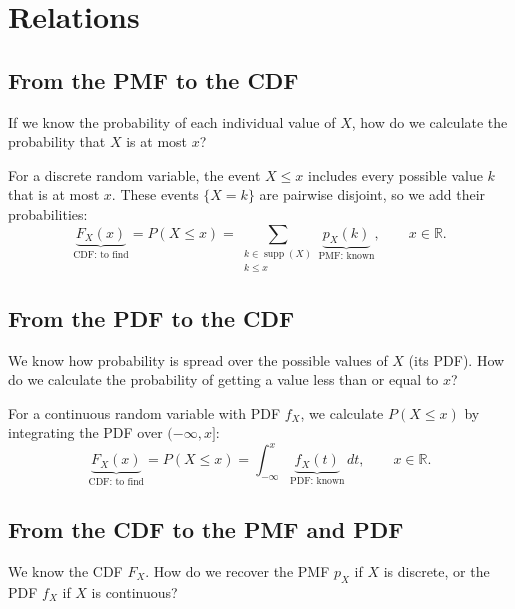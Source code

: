 \documentclass[a4paper,12pt,oneside]{report}
\begin{document}
\clearpage

\section{Relations}
\subsection{From the PMF to the CDF}
\begin{tcolorbox}[colback=blue!3,colframe=blue!30!black,
  boxrule=0.4pt,arc=1mm,title={What we are trying to answer},
  colbacktitle=blue!10,coltitle=black,fonttitle=\bfseries]
If we know the probability of each individual
value of $X$, how do we calculate the probability that $X$ is at most $x$?
\end{tcolorbox}

For a discrete random variable, the event $X\leq x$ includes every
possible value $k$ that is at most $x$. These events $\{X=k\}$ are
pairwise disjoint, so we add their probabilities:
\[
  \boxed{\underbrace{F_X(x)}_{\text{CDF: to find}}=P(X\leq x)
    =\sum_{\substack{k\in\operatorname{supp}(X)\\k\leq x}}
      \underbrace{p_X(k)}_{\text{PMF: known}},
    \qquad x\in\mathbb R.}
\]
\subsection{From the PDF to the CDF}
\label{rel:pdf-to-cdf}
\begin{tcolorbox}[colback=blue!3,colframe=blue!30!black,
  boxrule=0.4pt,arc=1mm,title={What we are trying to answer},
  colbacktitle=blue!10,coltitle=black,fonttitle=\bfseries]
We know how probability is spread over the possible values of $X$
(its PDF). How do we calculate the probability of getting a value
less than or equal to $x$?
\end{tcolorbox}
For a continuous random variable with PDF $f_X$, we calculate
$P(X\leq x)$ by integrating the PDF over $(-\infty,x]$:
\[
  \boxed{\underbrace{F_X(x)}_{\text{CDF: to find}}=P(X\leq x)
    =\int_{-\infty}^{x}\underbrace{f_X(t)}_{\text{PDF: known}}\,dt,
    \qquad x\in\mathbb R.}
\]
\subsection{From the CDF to the PMF and PDF}
\begin{tcolorbox}[colback=blue!3,colframe=blue!30!black,
  boxrule=0.4pt,arc=1mm,title={What we are trying to answer},
  colbacktitle=blue!10,coltitle=black,fonttitle=\bfseries]
We know the CDF $F_X$. How do we recover the PMF $p_X$ if $X$ is
discrete, or the PDF $f_X$ if $X$ is continuous?
\end{tcolorbox}
\end{document}
